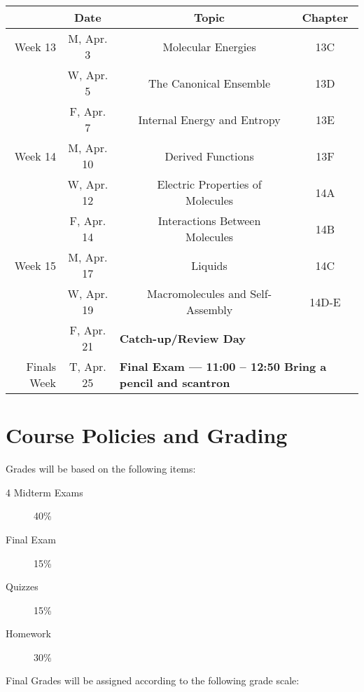 \documentclass[12pt, letterpaper]{article}
\begin{document}
\begin{tabular}{rcccc}
	            & Date       &                                                                                        & Topic                            & Chapter \\
	\midrule
	Week 13     & M, Apr. 3  &                                                                                        & Molecular Energies               & 13C     \\
	            & W, Apr. 5  &                                                                                        & The Canonical Ensemble           & 13D     \\
	            & F, Apr. 7  &                                                                                        & Internal Energy and Entropy      & 13E     \\
	\midrule
	Week 14     & M, Apr. 10 &                                                                                        & Derived Functions                & 13F     \\
	            & W, Apr. 12 &                                                                                        & Electric Properties of Molecules & 14A     \\
	            & F, Apr. 14 &                                                                                        & Interactions Between Molecules   & 14B     \\
	\midrule
	Week 15     & M, Apr. 17 &                                                                                        & Liquids                          & 14C     \\
	            & W, Apr. 19 &                                                                                        & Macromolecules and Self-Assembly & 14D-E   \\
	            & F, Apr. 21 & \multicolumn{3}{l}{\textbf{Catch-up/Review Day}}                                                                                    \\
	\midrule
	Finals Week & T, Apr. 25 & \multicolumn{3}{l}{\textbf{Final Exam --- 11:00 -- 12:50 Bring a pencil and scantron}}                                              \\
\end{tabular}

\section*{Course Policies and Grading}
Grades will be based on the following items:
\begin{description}
	\item[4 Midterm Exams] 40\%
	\item[Final Exam] 15\%
	\item[Quizzes] 15\%
	\item[Homework] 30\%
\end{description}
Final Grades will be assigned according to the following grade scale:
\end{document}
